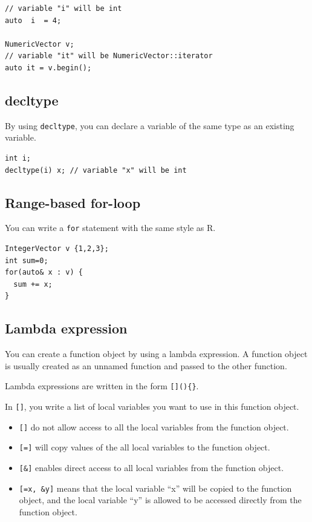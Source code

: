 \documentclass[
]{book}
\providecommand{\tightlist}{%
  \setlength{\itemsep}{0pt}\setlength{\parskip}{0pt}}
\begin{document}
\begin{verbatim}
// variable "i" will be int
auto  i  = 4;

NumericVector v;
// variable "it" will be NumericVector::iterator
auto it = v.begin();
\end{verbatim}

\hypertarget{decltype}{%
\subsection{decltype}\label{decltype}}

By using \texttt{decltype}, you can declare a variable of the same type as an existing variable.

\begin{verbatim}
int i;
decltype(i) x; // variable "x" will be int
\end{verbatim}

\hypertarget{range-based-for-loop}{%
\subsection{Range-based for-loop}\label{range-based-for-loop}}

You can write a \texttt{for} statement with the same style as R.

\begin{verbatim}
IntegerVector v {1,2,3};
int sum=0;
for(auto& x : v) {
  sum += x;
}
\end{verbatim}

\hypertarget{lambda-expression}{%
\subsection{Lambda expression}\label{lambda-expression}}

You can create a function object by using a lambda expression. A function object is usually created as an unnamed function and passed to the other function.

Lambda expressions are written in the form \texttt{{[}{]}()\{\}}.

In \texttt{{[}{]}}, you write a list of local variables you want to use in this function object.

\begin{itemize}
\tightlist
\item
  \texttt{{[}{]}} do not allow access to all the local variables from the function object.
\item
  \texttt{{[}={]}} will copy values of the all local variables to the function object.
\item
  \texttt{{[}\&{]}} enables direct access to all local variables from the function object.
\item
  \texttt{{[}=x,\ \&y{]}} means that the local variable ``x'' will be copied to the function object, and the local variable ``y'' is allowed to be accessed directly from the function object.
\end{itemize}
\end{document}
